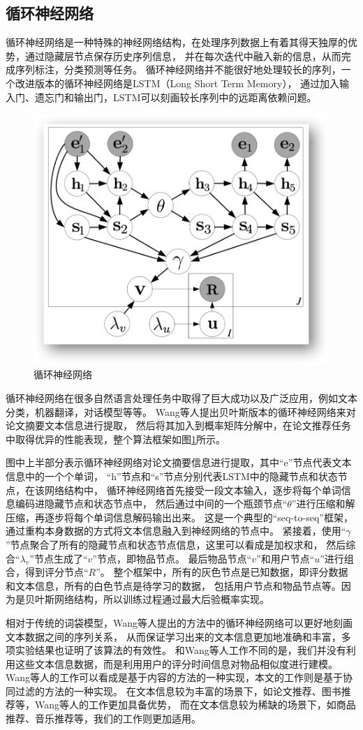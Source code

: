 \subsection{循环神经网络}
循环神经网络是一种特殊的神经网络结构，在处理序列数据上有着其得天独厚的优势，通过隐藏层节点保存历史序列信息，
并在每次迭代中融入新的信息，从而完成序列标注，分类预测等任务。
循环神经网络并不能很好地处理较长的序列，一个改进版本的循环神经网络是LSTM（Long Short Term Memory），
通过加入输入门、遗忘门和输出门，LSTM可以刻画较长序列中的远距离依赖问题。

\begin{figure}[htbp]
\centering
\includegraphics[scale=0.6]{images/pmf_rnn.png}
\caption{循环神经网络}
\label{fig:pmf_rnn}
\end{figure}

循环神经网络在很多自然语言处理任务中取得了巨大成功以及广泛应用，例如文本分类，机器翻译，对话模型等等。
Wang等人\parencite{wang2016collaborative}提出贝叶斯版本的循环神经网络来对论文摘要文本信息进行提取，
然后将其加入到概率矩阵分解中，在论文推荐任务中取得优异的性能表现，整个算法框架如图\ref{fig:pmf_rnn}所示。

图中上半部分表示循环神经网络对论文摘要信息进行提取，其中``e''节点代表文本信息中的一个个单词，
``h''节点和``s''节点分别代表LSTM中的隐藏节点和状态节点，在该网络结构中，
循环神经网络首先接受一段文本输入，逐步将每个单词信息编码进隐藏节点和状态节点中，
然后通过中间的一个瓶颈节点``$\theta$''进行压缩和解压缩，再逐步将每个单词信息解码输出出来。
这是一个典型的``seq-to-seq''框架，通过重构本身数据的方式将文本信息融入到神经网络的节点中。
紧接着，使用``$\gamma$''节点聚合了所有的隐藏节点和状态节点信息，这里可以看成是加权求和，
然后综合``$\lambda_v$''节点生成了``$v$''节点，即物品节点。
最后物品节点``$v$''和用户节点``$u$''进行组合，得到评分节点``$R$''。
整个框架中，所有的灰色节点是已知数据，即评分数据和文本信息，所有的白色节点是待学习的数据，
包括用户节点和物品节点等。因为是贝叶斯网络结构，所以训练过程通过最大后验概率实现。

相对于传统的词袋模型，Wang等人提出的方法中的循环神经网络可以更好地刻画文本数据之间的序列关系，
从而保证学习出来的文本信息更加地准确和丰富，多项实验结果也证明了该算法的有效性。
和Wang等人工作不同的是，我们并没有利用这些文本信息数据，而是利用用户的评分时间信息对物品相似度进行建模。
Wang等人的工作可以看成是基于内容的方法的一种实现，本文的工作则是基于协同过滤的方法的一种实现。
在文本信息较为丰富的场景下，如论文推荐、图书推荐等，Wang等人的工作更加具备优势，
而在文本信息较为稀缺的场景下，如商品推荐、音乐推荐等，我们的工作则更加适用。


